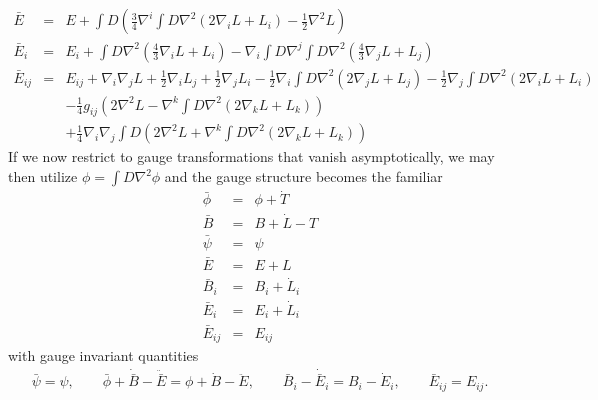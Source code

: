 \documentclass[10pt,letterpaper]{article}
\numberwithin{equation}{section}
\begin{document}
\begin{appendices}
\begin{eqnarray}
\nonumber\\
\bar E&=& E + \int D\left(\tfrac34 \nabla^i \int D\nabla^2(2\nabla_i L + L_i) -\tfrac12 \nabla^2 L\right)
\nonumber\\
\bar E_i &=& E_i + \int D\nabla^2 (\tfrac43 \nabla_i L + L_i) - \nabla_i \int D \nabla^j \int D\nabla^2 (\tfrac43 \nabla_j L + L_j)
\nonumber\\
\bar E_{ij} &=& E_{ij} +\nabla_i \nabla_j L + \tfrac12\nabla_i L_j + \tfrac12\nabla_j L_i
-\tfrac12\nabla_i \int D\nabla^2 (2\nabla_j L + L_j) - \tfrac12\nabla_j \int D \nabla^2 (2\nabla_i L + L_i)
\nonumber\\
&&-\tfrac14 g_{ij}\left( 2 \nabla^2 L - \nabla^k \int D \nabla^2( 2\nabla_k L + L_k)\right)
\nonumber\\
&& + \tfrac14 \nabla_i \nabla_j \int D \left( 2\nabla^2 L + \nabla^k \int D \nabla^2 (2\nabla_k L +L_k)\right)
\end{eqnarray}
If we now restrict to gauge transformations that vanish asymptotically, we may then utilize $\phi = \int D \nabla^2 \phi$ 
and the gauge structure becomes the familiar
\begin{eqnarray}
\bar\phi  &=& \phi + \dot T
\nonumber\\
\bar B &=& B + \dot L - T
\nonumber\\
\bar \psi &=& \psi
\nonumber\\
\bar E &=& E + L
\nonumber\\
\bar B_i &=& B_i + \dot L_i
\nonumber\\
\bar E_i &=& E_i + \dot L_i
\nonumber\\
\bar E_{ij} &=& E_{ij}
\end{eqnarray}
with gauge invariant quantities
\begin{eqnarray}
\bar\psi = \psi,\qquad \bar \phi + \dot{\bar B} - \ddot{\bar E} = \phi + \dot B - \ddot E,
\qquad \bar B_i - \dot{\bar E}_i = B_i - \dot E_i,\qquad \bar E_{ij} = E_{ij}.
\end{eqnarray}


\end{appendices}
\end{document}
